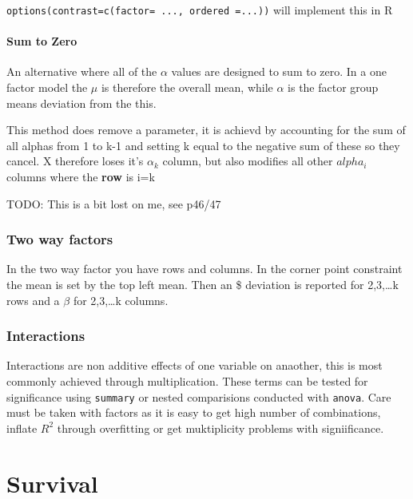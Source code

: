 \documentclass[
  letterpaper,
  DIV=11,
  numbers=noendperiod]{scrreprt}
\begin{document}
\texttt{options(contrast=c(factor=\ ...,\ ordered\ =...))} will
implement this in R

\hypertarget{sum-to-zero}{%
\subsubsection{Sum to Zero}\label{sum-to-zero}}

An alternative where all of the \(\alpha\) values are designed to sum to
zero. In a one factor model the \(\mu\) is therefore the overall mean,
while \(\alpha\) is the factor group means deviation from the this.

This method does remove a parameter, it is achievd by accounting for the
sum of all alphas from 1 to k-1 and setting k equal to the negative sum
of these so they cancel. X therefore loses it's \(\alpha_k\) column, but
also modifies all other \(alpha_i\) columns where the \textbf{row} is
i=k

TODO: This is a bit lost on me, see p46/47

\hypertarget{two-way-factors}{%
\subsection{Two way factors}\label{two-way-factors}}

In the two way factor you have rows and columns. In the corner point
constraint the mean is set by the top left mean. Then an \alpha\$
deviation is reported for 2,3,\ldots k rows and a \(\beta\) for
2,3,\ldots k columns.

\hypertarget{interactions}{%
\subsection{Interactions}\label{interactions}}

Interactions are non additive effects of one variable on anaother, this
is most commonly achieved through multiplication. These terms can be
tested for significance using \texttt{summary} or nested comparisions
conducted with \texttt{anova}. Care must be taken with factors as it is
easy to get high number of combinations, inflate \(R^2\) through
overfitting or get muktiplicity problems with signiificance.


\hypertarget{survival-1}{%
\chapter{Survival}\label{survival-1}}
\end{document}

